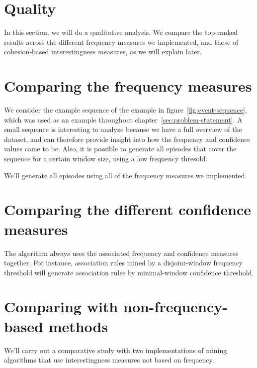 \section{Quality}

In this section, we will do a qualitative analysis. We compare the top-ranked results across the different frequency measures we implemented, and those of cohesion-based interestingness measures, as we will explain later.

\section{Comparing the frequency measures}

We consider the example sequence of the example in figure~\ref{fig:event-sequence}, which was used as an example throughout chapter~\ref{sec:problem-statement}. A small sequence is interesting to analyze because we have a full overview of the dataset, and can therefore provide insight into how the frequency and confidence values came to be. Also, it is possible to generate all episodes that cover the sequence for a certain window size, using a low frequency thresold.

We'll generate all episodes using all of the frequency measures we implemented.

\section{Comparing the different confidence measures}

The algorithm always uses the associated frequency and confidence measures together. For instance, association rules mined by a disjoint-window frequency threshold will generate association rules by  minimal-window confidence threshold.

\section{Comparing with non-frequency-based methods}

We'll carry out a comparative study with two implementations of mining algorithms that use interestingness measures not based on frequency.

